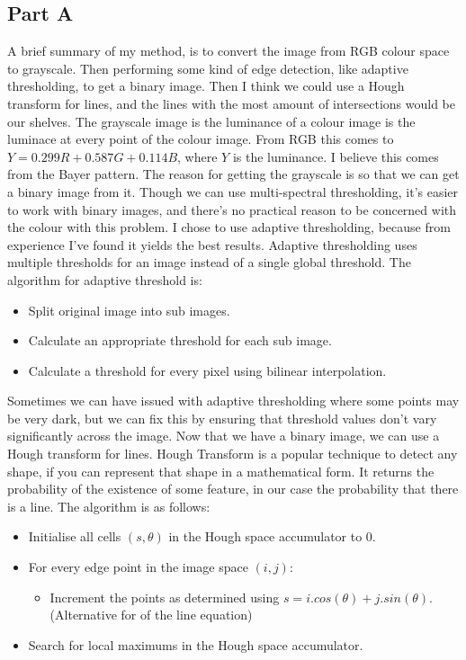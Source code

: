 \documentclass[12pt]{report}
\begin{document}
\subsection{Part A}
A brief summary of my method, is to convert the image from RGB colour space to grayscale. Then performing some kind of edge detection, like adaptive thresholding, to get a binary image. Then I think we could use a Hough transform for lines, and the lines with the most amount of intersections would be our shelves.
\newline
The grayscale image is the luminance of a colour image is the luminace at every point of the colour image. From RGB this comes to $Y = 0.299R + 0.587G + 0.114B$, where $Y$ is the luminance. I believe this comes from the Bayer pattern. 
\newline
The reason for getting the grayscale is so that we can get a binary image from it. Though we can use multi-spectral thresholding, it's easier to work with binary images, and there's no practical reason to be concerned with the colour with this problem. I chose to use adaptive thresholding, because from experience I've found it yields the best results. Adaptive thresholding uses multiple thresholds for an image instead of a single global threshold. The algorithm for adaptive threshold is: 
\begin{itemize}
\item Split original image into sub images.
\item Calculate an appropriate threshold for each sub image.
\item Calculate a threshold for every pixel using bilinear interpolation.
\end{itemize}
Sometimes we can have issued with adaptive thresholding where some points may be very dark, but we can fix this by ensuring that threshold values don't vary significantly across the image. 
\newline
Now that we have a binary image, we can use a Hough transform for lines. Hough Transform is a popular technique to detect any shape, if you can represent that shape in a mathematical form. It returns the probability of the existence of some feature, in our case the probability that there is a line. The algorithm is as follows:
\begin{itemize}
\item Initialise all cells $(s, \theta)$ in the Hough space accumulator to 0.
\item For every edge point in the image space $(i,j)$:
	\begin{itemize}
	\item Increment the points as determined using $s = i.cos(\theta) + j.sin(\theta).$ (Alternative for of the line equation)
	\end{itemize}
\item Search for local maximums in the Hough space accumulator. 
\end{itemize}
\end{document}
